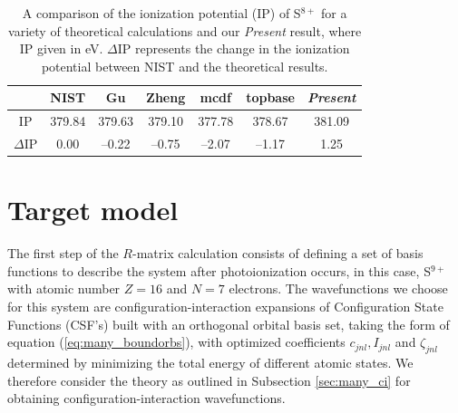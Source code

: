 \begin{table}[t]
\footnotesize
\begin{center}
\begin{tabular}{@{} l *6c @{}}
\toprule
\multicolumn{1}{c}{} & \multicolumn{1}{c}{NIST} & \multicolumn{1}{c}{Gu} & \multicolumn{1}{c}{Zheng} & \multicolumn{1}{c}{{\sc mcdf}} & \multicolumn{1}{c}{{\sc top}base} & \multicolumn{1}{c}{\textit{Present}} \\
 \toprule
       \multicolumn{1}{c}{IP}& 379.84 & 379.63 & 379.10 & 377.78 & 378.67& 381.09 \\
        \multicolumn{1}{c}{$\Delta$IP} & 0.00 & --0.22 & --0.75 & --2.07 & --1.17 & 1.25\\
\bottomrule
 \end{tabular}
 \caption{A comparison of the ionization potential (IP) of S$^{8+}$ for a variety of theoretical calculations and our \textit{Present} result, where IP given in eV. $\Delta$IP represents the change in the ionization potential between NIST and the theoretical results. \label{tab:sul_ip}}
 \end{center}
\end{table}

\section{Target model}\label{sec:sul_target}
The first step of the $R$-matrix calculation consists of defining a set of basis functions to describe the system after photoionization occurs, in this case, S$^{9+}$ with atomic number $Z=16$ and $N=7$ electrons. The wavefunctions we choose for this system are configuration-interaction expansions of Configuration State Functions (CSF's) built with an orthogonal orbital basis set, taking the form of equation (\ref{eq:many_boundorbs}), with optimized coefficients $c_{jnl}, I_{jnl}$ and $\zeta_{jnl}$ determined by minimizing the total energy of different atomic states. We therefore consider the theory as outlined in Subsection \ref{sec:many_ci} for obtaining configuration-interaction wavefunctions.

